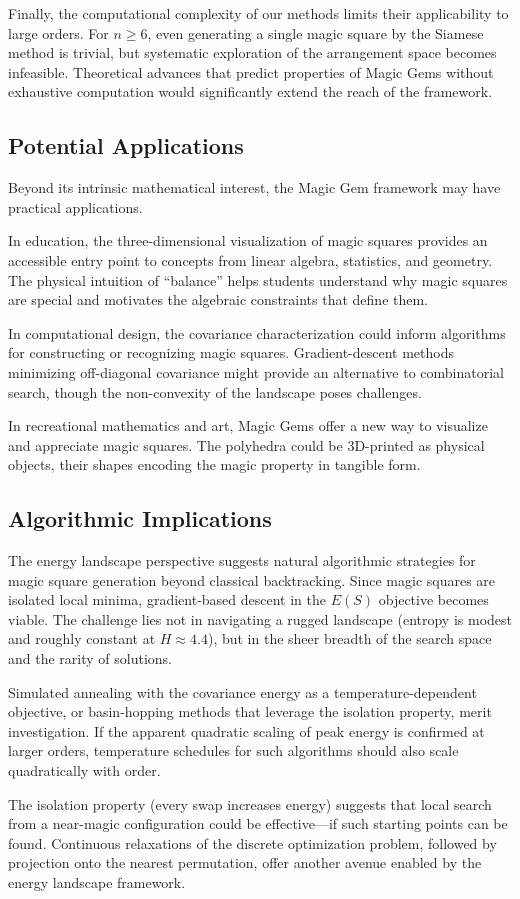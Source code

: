 Finally, the computational complexity of our methods limits their applicability to large orders.
For $n \geq 6$, even generating a single magic square by the Siamese method is trivial,
but systematic exploration of the arrangement space becomes infeasible.
Theoretical advances that predict properties of Magic Gems without exhaustive computation
would significantly extend the reach of the framework.

\subsection{Potential Applications}

Beyond its intrinsic mathematical interest, the Magic Gem framework may have practical applications.

In education, the three-dimensional visualization of magic squares
provides an accessible entry point to concepts from linear algebra, statistics, and geometry.
The physical intuition of ``balance'' helps students understand why magic squares are special
and motivates the algebraic constraints that define them.

In computational design, the covariance characterization could inform algorithms
for constructing or recognizing magic squares.
Gradient-descent methods minimizing off-diagonal covariance might provide 
an alternative to combinatorial search, though the non-convexity of the landscape poses challenges.

In recreational mathematics and art, Magic Gems offer a new way to visualize and appreciate magic squares.
The polyhedra could be 3D-printed as physical objects, 
their shapes encoding the magic property in tangible form.

\subsection{Algorithmic Implications}

The energy landscape perspective suggests natural algorithmic strategies 
for magic square generation beyond classical backtracking. 
Since magic squares are isolated local minima, gradient-based descent in the 
$E(S)$ objective becomes viable. 
The challenge lies not in navigating a rugged landscape (entropy is modest and roughly constant at $H \approx 4.4$), 
but in the sheer breadth of the search space and the rarity of solutions.

Simulated annealing with the covariance energy as a temperature-dependent objective, 
or basin-hopping methods that leverage the isolation property, merit investigation. 
If the apparent quadratic scaling of peak energy is confirmed at larger orders, 
temperature schedules for such algorithms should also scale quadratically with order.

The isolation property (every swap increases energy) suggests that local search 
from a near-magic configuration could be effective---if such starting points can be found.
Continuous relaxations of the discrete optimization problem, 
followed by projection onto the nearest permutation, 
offer another avenue enabled by the energy landscape framework.
